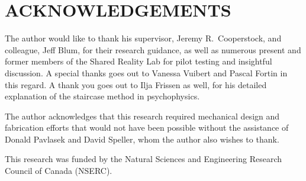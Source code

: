 \documentclass [12pt,letterpaper]{report}
\begin{document}
\section*{\centering ACKNOWLEDGEMENTS}

The author would like to thank his supervisor, Jeremy R.\ Cooperstock, and colleague, Jeff Blum, for their research guidance, as well as numerous present and former members of the Shared Reality Lab for pilot testing and insightful discussion. A special thanks goes out to Vanessa Vuibert and Pascal Fortin in this regard. A thank you goes out to Ilja Frissen as well, for his detailed explanation of the staircase method in psychophysics.

The author acknowledges that this research required mechanical design and fabrication efforts that would not have been possible without the assistance of Donald Pavlasek and David Speller, whom the author also wishes to thank.

This research was funded by the Natural Sciences and Engineering Research Council of Canada (NSERC).



\tableofcontents
\listoffigures
\listoftables

\newpage
\end{document}
